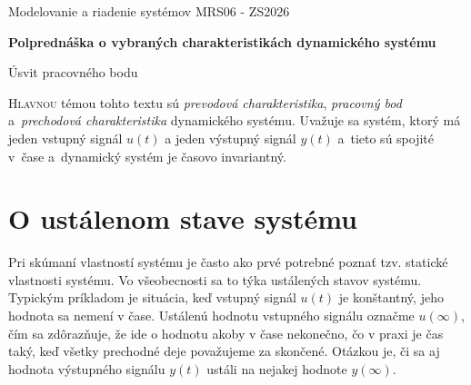 \documentclass[a4paper, 10pt, ]{article}
\def\oznacenieCasti{MRS06 - ZS2026}
\begin{document}
\lstset{style=mystyle}


\fontsize{12pt}{22pt}\selectfont

\centerline{\textsf{Modelovanie a riadenie systémov} \hfill \textsf{\oznacenieCasti}}

\fontsize{18pt}{22pt}\selectfont

\begin{flushleft}
	\textbf{\textsf{Polprednáška o vybraných charakteristikách dynamického systému}}
\end{flushleft}

\fontsize{12pt}{14pt}\selectfont

\begin{flushleft}
	{\textsf{Úsvit pracovného bodu}}
\end{flushleft}



\normalsize

\bigskip

{\hypersetup{hidelinks}

\tableofcontents

}

\bigskip

\vspace{18pt}



\noindent
\lettrine[lines=3, nindent=0pt]{H}{lavnou} témou tohto textu sú \emph{prevodová charakteristika}, \emph{pracovný bod} a~\emph{prechodová charakteristika} dynamického systému. Uvažuje sa systém, ktorý má jeden vstupný signál $u(t)$ a jeden výstupný signál $y(t)$ a~tieto sú spojité v~čase a~dynamický systém je časovo invariantný.





\section{O ustálenom stave systému}

Pri skúmaní vlastností systému je často ako prvé potrebné poznať tzv. statické vlastnosti systému. Vo všeobecnosti sa to týka ustálených stavov systému. Typickým príkladom je situácia, keď vstupný signál $u(t)$ je konštantný, jeho hodnota sa nemení v čase. Ustálenú hodnotu vstupného signálu označme $u(\infty)$, čím sa zdôrazňuje, že ide o hodnotu akoby v čase nekonečno, čo v praxi je čas taký, keď všetky prechodné deje považujeme za skončené. Otázkou je, či sa aj hodnota výstupného signálu $y(t)$ ustáli na nejakej hodnote $y(\infty)$. 
\end{document}
